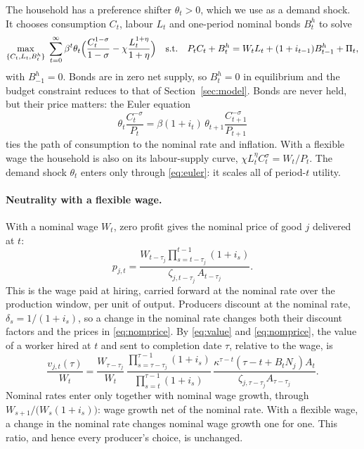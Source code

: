 \documentclass[11pt]{article}
\theoremstyle{definition}
\begin{document}
The household has a preference shifter $\theta_t>0$, which we use as a demand shock. It chooses
consumption $C_t$, labour $L_t$ and one-period nominal bonds $B^h_t$ to solve
\begin{equation}\label{eq:hhb}
  \max_{\{C_t,L_t,B^h_t\}}\;\sum_{t=0}^{\infty}\beta^t\theta_t
     \Bigl(\frac{C_t^{1-\sigma}}{1-\sigma}-\chi\frac{L_t^{1+\eta}}{1+\eta}\Bigr)
  \quad\text{s.t.}\quad
  P_tC_t+B^h_t=W_tL_t+(1+i_{t-1})B^h_{t-1}+\Pi_t ,
\end{equation}
with $B^h_{-1}=0$. Bonds are in zero net supply, so $B^h_t=0$ in equilibrium and the budget
constraint reduces to that of Section~\ref{sec:model}. Bonds are never held, but their price
matters: the Euler equation
\begin{equation}\label{eq:euler}
  \theta_t\frac{C_t^{-\sigma}}{P_t}=\beta(1+i_t)\,\theta_{t+1}\frac{C_{t+1}^{-\sigma}}{P_{t+1}}
\end{equation}
ties the path of consumption to the nominal rate and inflation. With a flexible wage the household
is also on its labour-supply curve, $\chi L_t^{\eta}C_t^{\sigma}=W_t/P_t$. The demand shock $\theta_t$
enters only through \eqref{eq:euler}: it scales all of period-$t$ utility.

\paragraph{Neutrality with a flexible wage.} With a nominal wage $W_t$, zero profit gives the
nominal price of good $j$ delivered at $t$:
\begin{equation}\label{eq:nomprice}
  p_{j,t}=\frac{W_{t-\tau_j}\prod_{s=t-\tau_j}^{t-1}(1+i_s)}{\zeta_{j,t-\tau_j}\,A_{t-\tau_j}} .
\end{equation}
This is the wage paid at hiring, carried forward at the nominal rate over the production window,
per unit of output. Producers discount at the nominal rate, $\delta_s=1/(1+i_s)$, so a change in
the nominal rate changes both their discount factors and the prices in \eqref{eq:nomprice}. By
\eqref{eq:value} and \eqref{eq:nomprice}, the value of a worker hired at $t$ and sent to completion
date $\tau$, relative to the wage, is
\begin{equation}\label{eq:valnom}
  \frac{v_{j,t}(\tau)}{W_t}
  =\frac{W_{\tau-\tau_j}}{W_t}\,
   \frac{\prod_{s=\tau-\tau_j}^{\tau-1}(1+i_s)}{\prod_{s=t}^{\tau-1}(1+i_s)}\,
   \frac{\kappa^{\tau-t}(\tau-t+B_tN_j)A_t}{\zeta_{j,\tau-\tau_j}A_{\tau-\tau_j}} .
\end{equation}
Nominal rates enter only together with nominal wage growth, through $W_{s+1}/\bigl(W_s(1+i_s)\bigr)$:
wage growth net of the nominal rate. With a flexible wage, a change in the nominal rate changes
nominal wage growth one for one. This ratio, and hence every producer's choice, is unchanged.
\end{document}
